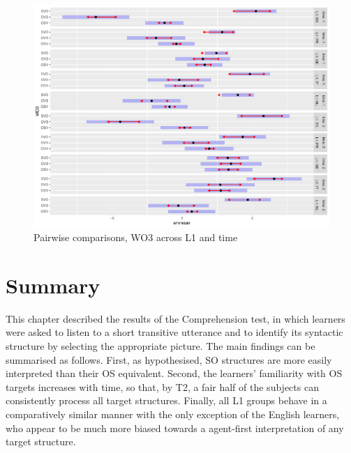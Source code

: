 \begin{figure}
    \includegraphics[width=\textwidth]{figures/05-9.pdf}
    \caption{Pairwise comparisons, WO3 across L1 and time}
    \label{fig:05:9}
\end{figure}

\section{Summary}\label{sec:05:3}

This chapter described the results of the Comprehension test, in which learners were asked to listen to a short transitive utterance and to identify its syntactic structure by selecting the appropriate picture. The main findings can be summarised as follows. First, as hypothesised, SO structures are more easily interpreted than their OS equivalent. Second, the learners' familiarity with OS targets increases with time, so that, by T2, a fair half of the subjects can consistently process all target structures. Finally, all L1 groups behave in a comparatively similar manner with the only exception of the English learners, who appear to be much more biased towards a agent-first interpretation of any target structure.
